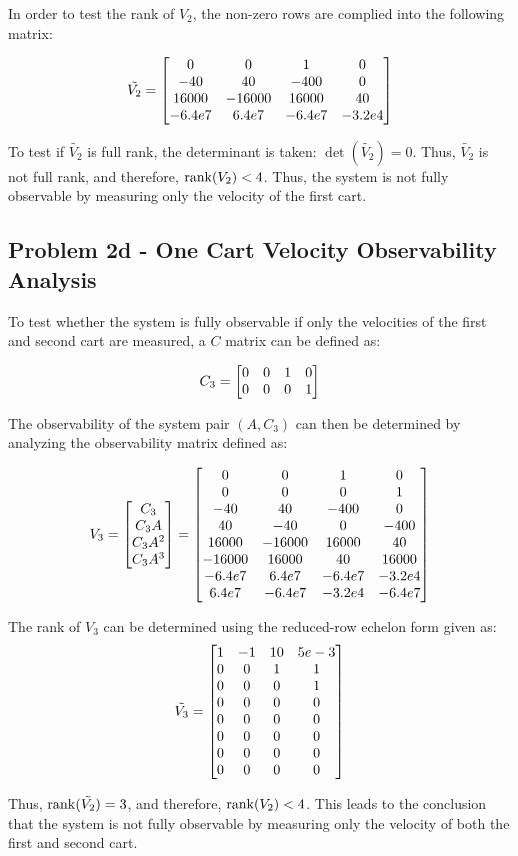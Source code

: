 \documentclass[]{article}
\begin{document}
		In order to test the rank of $V_2$, the non-zero rows are complied into the following matrix:
		
		\begin{equation}
			\tilde{V_2} = \mqty[0		&0		&1		&0\\
								-40		&40		&-400	&0\\
								16000	&-16000	&16000	&40\\
								-6.4e7	&6.4e7	&-6.4e7	&-3.2e4]
		\end{equation}
		
		To test if $\tilde{V_2}$ is full rank, the determinant is taken: $\det(\tilde{V_2}) = 0$. Thus, $\tilde{V_2}$ is not full rank, and therefore, $\rank(V_2) < 4$. Thus, the system is not fully observable by measuring only the velocity of the first cart.
			
		\subsection{Problem 2d - One Cart Velocity Observability Analysis}
			To test whether the system is fully observable if only the velocities of the first and second cart are measured, a $C$ matrix can be defined as:
			
			\begin{equation}
				C_3 = \mqty[0	&0	&1	&0\\
							0	&0	&0	&1]
			\end{equation}
			
			The observability of the system pair $(A, C_3)$ can then be determined by analyzing the observability matrix defined as:
			
			\begin{equation}
				V_3 = \mqty[C_3\\ C_3A\\ C_3A^2\\ C_3A^3]
					= \mqty[0		&0		&1		&0\\
							0		&0		&0		&1\\
							-40		&40		&-400	&0\\
							40		&-40		&0		&-400\\
							16000	&-16000	&16000	&40\\
							-16000	&16000	&40		&16000\\
							-6.4e7	&6.4e7	&-6.4e7	&-3.2e4\\
							6.4e7	&-6.4e7	&-3.2e4	&-6.4e7]
			\end{equation}
			
			The rank of $V_3$ can be determined using the reduced-row echelon form given as:
			\begin{equation}
				\tilde{V_3} = \mqty[1	&-1	&10	&5e-3\\
									0	&0	&1	&1\\
									0	&0	&0	&1\\
									0	&0	&0	&0\\
									0	&0	&0	&0\\
									0	&0	&0	&0\\
									0	&0	&0	&0\\
									0	&0	&0	&0]
			\end{equation}
			
			Thus, $\rank(\tilde{V_2}) = 3$, and therefore, $\rank(V_2) < 4$. This leads to the conclusion that the system is not fully observable by measuring only the velocity of both the first and second cart.
		
\end{document}
